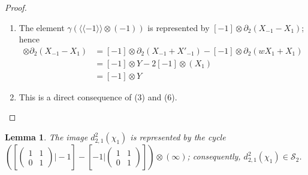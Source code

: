 \documentclass[11pt]{amsart}
\theoremstyle{definition}
\theoremstyle{plain}
\newtheorem{lem}[ntn]{Lemma}
\theoremstyle{definition}
\numberwithin{equation}{section}
\renewcommand{\SS}{\mathcal{S}}
\newcommand{\lan}{\langle}
\newcommand{\ran}{\rangle}
\newcommand{\Lan}{\langle \! \langle}
\newcommand{\Ran}{\rangle \! \rangle}
\newcommand{\id}{{\rm id}}
\newcommand{\im}{{\rm im}}
\newcommand{\mtxx}[4]
{\left(\!\!
	\begin{array}{cc}
		\!\!#1 & \!\!#2\\
		\!\!#3 & \!\!#4
	\end{array}\!\!
	\right)}
\begin{document}
\begin{proof}
\begin{enumerate}
			\[
			[a]\otimes Y=d_2\otimes\id(([w|a]-[a^{-1}|w]+[a^{-1}|a])\otimes(\pmb{\infty},\pmb{0}))
			\]
			Applying $\id\otimes\partial_1$, we obtain, modulo $\im(d_3\otimes\id)$,
			\[
			\begin{split}
				d^2_{2,1}(\alpha(\lan a\ran))&=\{w([w|a]-[a^{-1}|w]+[a^{-1}|a])-([w|a]-[a^{-1}|w]+[a^{-1}|a])\}\otimes(\pmb{\infty})\\
				&=([-1|a]-[a|-1])\otimes(\pmb{\infty})
			\end{split}
			\]
			where the last line is obtained by adding the trivial element
			\[
			d_3\otimes\id(\{-[w|w|a]+[w|a^{-1}|a]-[w|a^{-1}|a]-[a|w|w]+[a|w|a]-[a|a^{-1}|w]-[a^{-1}|a|a^{-1}]\}\otimes(\pmb{\infty}))
			\]
			\item The element $\gamma(\Lan -1\Ran\otimes(-1))$ is represented by $[-1]\otimes\partial_2(X_{-1}-X_1)$; hence
			\begin{align*}
				[-1]\otimes\partial_2(X_{-1}-X_1)&=[-1]\otimes\partial_2(X_{-1}+X'_{-1})-[-1]\otimes\partial_2(wX_1+X_1)\\
				&=[-1]\otimes Y - 2[-1]\otimes(X_1)\\
				&=[-1]\otimes Y
			\end{align*}
			\item This is a direct consequence of (3) and (6).
		\end{enumerate}
	\end{proof}
	\begin{lem}\label{d2-chi}
		The image $d^2_{2,1}(\chi_1)$ is represented by the cycle $(\left[\mtxx{1}{1}{0}{1}\bigg|-1\right]-\left[-1\bigg|\mtxx{1}{1}{0}{1}\right])\otimes(\pmb{\infty})$; consequently, $d^2_{2,1}(\chi_1)\in\SS_2$.
	\end{lem}
\end{document}
